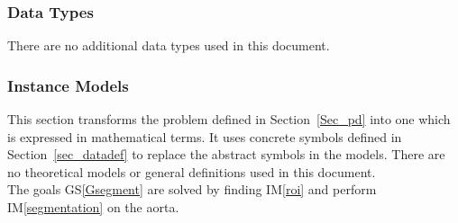 \documentclass[12pt]{article}
\newcommand{\gsref}[1]{GS\ref{#1}}
\newcommand{\iref}[1]{IM\ref{#1}}
\begin{document}
\subsubsection{Data Types}\label{sec_datatypes}
There are no additional data types used in this document.

\subsubsection{Instance Models} \label{sec_instance}    

This section transforms the problem defined in Section~\ref{Sec_pd} into 
one which is expressed in mathematical terms. It uses concrete symbols defined 
in Section~\ref{sec_datadef} to replace the abstract symbols in the models. There are no theoretical models or general definitions used in this document.\\

\noindent 
The goals \gsref{Gsegment} are solved by finding \iref{roi} and perform \iref{segmentation} on the aorta.

~\newline

\end{document}
